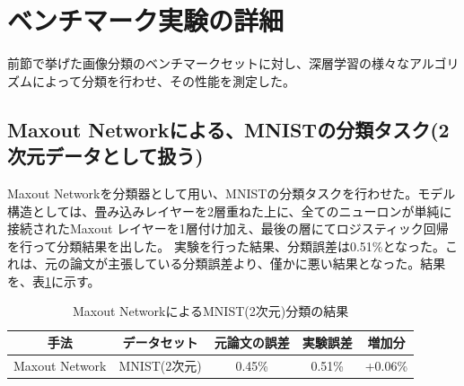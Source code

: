 \section{ベンチマーク実験の詳細}
前節で挙げた画像分類のベンチマークセットに対し、深層学習の様々なアルゴリズムによって分類を行わせ、その性能を測定した。

\subsection{Maxout Networkによる、MNISTの分類タスク(2次元データとして扱う)}
Maxout Networkを分類器として用い、MNISTの分類タスクを行わせた。モデル構造としては、畳み込みレイヤーを2層重ねた上に、全てのニューロンが単純に接続されたMaxout レイヤーを1層付け加え、最後の層にてロジスティック回帰を行って分類結果を出した。
実験を行った結果、分類誤差は0.51\%となった。これは、元の論文が主張している分類誤差より、僅かに悪い結果となった。結果を、表\ref{c5_maxout_mnist2_result}に示す。
\begin{table}[tdp]
\caption{Maxout NetworkによるMNIST(2次元)分類の結果}
\begin{center}
\begin{tabular}{|c|c|c|c|c|}\hline
手法 & データセット & 元論文の誤差 & 実験誤差 & 増加分\\ \hline
Maxout Network & MNIST(2次元) & 0.45\% & 0.51\% & +0.06\% \\ \hline
\end{tabular}
\end{center}
\label{c5_maxout_mnist2_result}
\end{table}%

